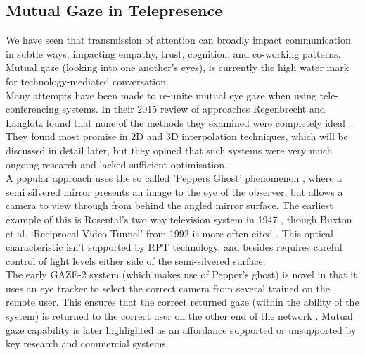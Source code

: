 \subsection{Mutual Gaze in Telepresence}
          We have seen that transmission of attention can broadly impact communication in subtle ways, impacting empathy, trust, cognition, and co-working patterns. Mutual gaze (looking into one another's eyes), is currently the high water mark for technology-mediated conversation.\\
          Many attempts have been made to re-unite mutual eye gaze when using tele-conferencing systems. In their 2015 review of approaches Regenbrecht and Langlotz found that none of the methods they examined were completely ideal \cite{Regenbrecht2015}. They found most promise in 2D and 3D interpolation techniques, which will be discussed in detail later, but they opined that such systems were very much ongoing research and lacked sufficient optimisation.\\
          A popular approach uses the so called 'Peppers Ghost' phenomenon \cite{steinmeyer2013science}, where a semi silvered mirror presents an image to the eye of the observer, but allows a camera to view through from behind the angled mirror surface. The earliest example of this is Rosental's two way television system in 1947 \cite{rosenthal1947two}, though Buxton et al. `Reciprocal Video Tunnel' from 1992 is more often cited \cite{buxton1992telepresence}. This optical characteristic isn't supported by RPT technology, and besides requires careful control of light levels either side of the semi-silvered surface.\\  
The early GAZE-2 system (which makes use of Pepper's ghost) is novel in that it uses an eye tracker to select the correct camera from several trained on the remote user. This ensures that the correct returned gaze (within the ability of the system) is returned to the correct user on the other end of the network \cite{Vertegaal2003}.
Mutual gaze capability is later highlighted as an affordance supported or unsupported by key research and commercial systems.                           

